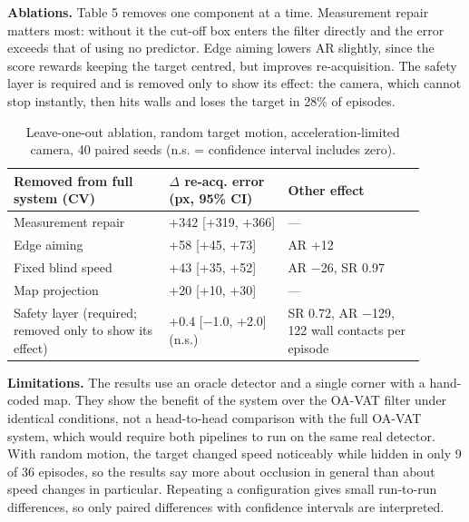 \documentclass[12pt,a4paper]{article}
\begin{document}
\textbf{Ablations.} Table 5 removes one component at a time. Measurement repair matters most: without it the cut-off box enters the filter directly and the error exceeds that of using no predictor. Edge aiming lowers AR slightly, since the score rewards keeping the target centred, but improves re-acquisition. The safety layer is required and is removed only to show its effect: the camera, which cannot stop instantly, then hits walls and loses the target in 28\% of episodes.

\begin{table}[htbp]
  \centering
  \small
  \caption{Leave-one-out ablation, random target motion, acceleration-limited camera, 40 paired seeds (n.s. = confidence interval includes zero).}
  \renewcommand{\arraystretch}{1.15}
  \begin{tabular}{>{\raggedright\arraybackslash}p{0.34\linewidth}>{\raggedright\arraybackslash}p{0.26\linewidth}>{\raggedright\arraybackslash}p{0.30\linewidth}}
  \toprule
  \textbf{Removed from full system (CV)} & \textbf{$\Delta$ re-acq. error (px, 95\% CI)} & \textbf{Other effect} \\
  \midrule
  Measurement repair & +342 [+319, +366] & — \\
  Edge aiming & +58 [+45, +73] & AR +12 \\
  Fixed blind speed & +43 [+35, +52] & AR $-$26, SR 0.97 \\
  Map projection & +20 [+10, +30] & — \\
  Safety layer (required; removed only to show its effect) & +0.4 [$-$1.0, +2.0] (n.s.) & SR 0.72, AR $-$129, 122 wall contacts per episode \\
  \bottomrule
  \end{tabular}
\end{table}

\textbf{Limitations.} The results use an oracle detector and a single corner with a hand-coded map. They show the benefit of the system over the OA-VAT filter under identical conditions, not a head-to-head comparison with the full OA-VAT system, which would require both pipelines to run on the same real detector. With random motion, the target changed speed noticeably while hidden in only 9 of 36 episodes, so the results say more about occlusion in general than about speed changes in particular. Repeating a configuration gives small run-to-run differences, so only paired differences with confidence intervals are interpreted.
\end{document}
